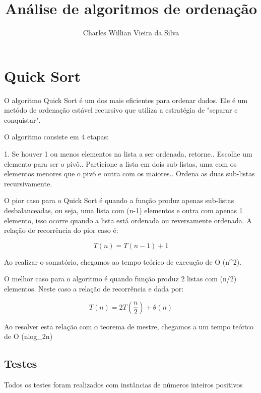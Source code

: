 \documentclass{article}
\author{Charles Willian Vieira da Silva}
\title{Análise de algoritmos de ordenação}
\begin{document}
\maketitle

\section{Quick Sort}
O algoritmo Quick Sort é um dos mais eficientes para ordenar dados. Ele é um metódo de ordenação estável recursivo que utiliza a estratégia de "separar e conquistar".

O algoritmo consiste em 4 etapas:

1. Se houver 1 ou menos elementos na lista a ser ordenada, retorne.. Escolhe um elemento para ser o pivô.. Particione a lista em dois sub-listas, uma com os elementos menores que o pivô e outra com os maiores.. Ordena as duas sub-listas recursivamente.\linebreak

O pior caso para o Quick Sort é quando a função produz apenas sub-listas desbalanceadas, ou seja, uma lista com (n-1) elementos e outra com apenas 1 elemento, isso ocorre quando a lista está ordenada ou reversamente ordenada. A relação de recorrência do pior caso é:

\begin{displaymath} T(n)=T(n-1)+1  \end{displaymath}

Ao realizar o somatório, chegamos ao tempo teórico de execução de {\displaystyle O (n^{2})}.\linebreak

O melhor caso para o algoritmo é quando função produz 2 listas com (n/2) elementos. Neste caso a relação de recorrência e dada por: 

\begin{displaymath} T(n) = 2T({\frac {n}{2}})+\theta (n)\end{displaymath}

Ao resolver esta relação com o teorema de mestre, chegamos a um tempo teórico de {\displaystyle O (nlog_{2}n)} 

\subsection{Testes}

Todos os testes foram realizados com instâncias de números inteiros positivos
\end{document}
